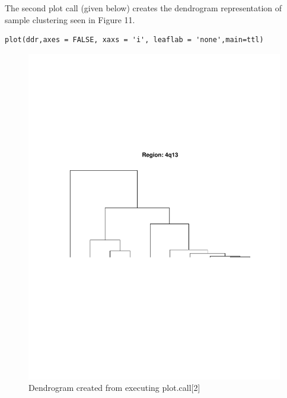 \documentclass[]{article}
\begin{document}
\indent The second plot call (given below) creates the dendrogram representation of sample clustering seen in Figure 11.
\begin{verbatim}
plot(ddr,axes = FALSE, xaxs = 'i', leaflab = 'none',main=ttl)
\end{verbatim}

\begin{center}
\begin{figure}
\includegraphics{dendro}
\caption{Dendrogram created from executing plot.call[2]}
\end{figure}
\end{center}
\end{document}
